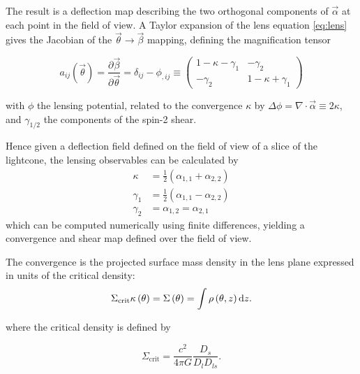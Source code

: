 \documentclass{beamer}
\begin{document}
  \begin{frame}
    The result is a deflection map describing the two orthogonal components of $\vec{\alpha}$ at each point in the field of view. A Taylor expansion of the lens equation \ref{eq:lens} gives the Jacobian of the $\vec{\theta} \rightarrow \vec{\beta}$ mapping, defining the magnification tensor

    \begin{equation} \label{eq:mu tensor}
      a_{ij}\left( \vec{\theta} \right) = \frac{\partial\vec{\beta}}{\partial\vec{\theta}} = \delta_{ij} - \phi_{,ij} \equiv
      \begin{pmatrix}
        1 - \kappa - \gamma_1 & -\gamma_2 \\
        -\gamma_2 & 1 - \kappa + \gamma_1
      \end{pmatrix}
    \end{equation}

    with $\phi$ the lensing potential, related to the convergence $\kappa$ by $\Delta \phi = \nabla \cdot \vec{\alpha} \equiv 2\kappa$, and $\gamma_{1/2}$ the components of the spin-2 shear.
  \end{frame}

  \begin{frame}
    Hence given a deflection field defined on the field of view of a slice of the lightcone, the lensing observables can be calculated by
    \begin{align} \label{eq:lensing observables}
      \kappa &= \frac{1}{2}\left( \alpha_{1,1} + \alpha_{2,2} \right) \\
      \gamma_1 &= \frac{1}{2}\left( \alpha_{1,1} - \alpha_{2,2} \right) \\
      \gamma_2 &= \alpha_{1,2} = \alpha_{2,1}
    \end{align}
    which can be computed numerically using finite differences, yielding a convergence and shear map defined over the field of view.
  \end{frame}

  \begin{frame}
    The convergence is the projected surface mass density in the lens plane expressed in units of the critical density:
    \begin{equation} \label{eq:sigma_kappa}
      \Sigma_{\text{crit}} \kappa\left( \theta \right) = \Sigma\left( \theta \right) = \int\rho\left( \theta, z \right) \dif z.
    \end{equation}

    where the critical density is defined by

    \begin{equation} \label{eq:critical density}
      \Sigma_{\text{crit}} = \frac{c^2}{4\pi G}\frac{D_{s}}{D_{l}D_{ls}}.
    \end{equation}
  \end{frame}
\end{document}
